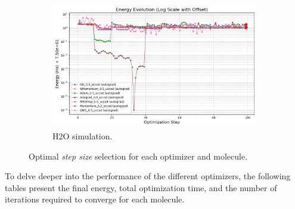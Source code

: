 \begin{figure}[H]
\begin{subfigure}{0.45\textwidth}
    \label{fig:subimage2}
  \end{subfigure}
  \begin{subfigure}{0.45\textwidth}
    \includegraphics[width=\textwidth]{data/Optimizadores/final_results_H20/energy_evolution_log_offset.png}
    \caption{H2O simulation.}
    \label{fig:subimage3}
  \end{subfigure}
  \caption{Optimal \emph{step size} selection for each optimizer and molecule.}
  \label{fig:three_images}
\end{figure}

To delve deeper into the performance of the different optimizers, the following tables present the final energy, total optimization time, and the number of iterations required to converge for each molecule.

